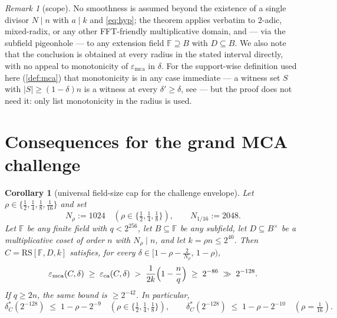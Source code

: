 \documentclass[11pt]{article}
\newtheorem{corollary}[theorem]{Corollary}
\theoremstyle{definition}
\theoremstyle{remark}
\newtheorem{remark}[theorem]{Remark}
\newcommand{\F}{\mathbb{F}}
\newcommand{\B}{B}
\newcommand{\RS}{\mathrm{RS}}
\newcommand{\eca}{\varepsilon_{\mathrm{ca}}}
\newcommand{\emca}{\varepsilon_{\mathrm{mca}}}
\begin{document}
\begin{remark}[scope]\label{rem:scope}
No smoothness is assumed beyond the existence of a single divisor $N\mid n$ with $a\mid k$ and \eqref{eq:hyp}; the theorem applies verbatim to $2$-adic, mixed-radix, or any other FFT-friendly multiplicative domain, and --- via the subfield pigeonhole --- to any extension field $\F\supseteq\B$ with $D\subseteq\B$. We also note that the conclusion is obtained at every radius in the stated interval directly, with no appeal to monotonicity of $\emca$ in $\delta$. For the support-wise definition used here (\cref{def:mca}) that monotonicity is in any case immediate --- a witness set $S$ with $|S|\ge(1-\delta)n$ is a witness at every $\delta'\ge\delta$, see \cite[Lem.\ ``Monotonicity'']{Cho26a} --- but the proof does not need it: only list monotonicity in the radius is used.
\end{remark}

\section{Consequences for the grand MCA challenge}\label{sec:grand}

\begin{corollary}[universal field-size cap for the challenge envelope]\label{cor:grand}
Let $\rho\in\{\frac12,\frac14,\frac18,\frac1{16}\}$ and set
\[
N_\rho:=1024\quad(\rho\in\{\tfrac12,\tfrac14,\tfrac18\}),\qquad N_{1/16}:=2048 .
\]
Let $\F$ be any finite field with $q<2^{256}$, let $\B\subseteq\F$ be any subfield, let $D\subseteq\B^\times$ be a multiplicative coset of order $n$ with $N_\rho\mid n$, and let $k=\rho n\le2^{40}$. Then $C=\RS[\F,D,k]$ satisfies, for every $\delta\in\bigl[1-\rho-\frac2{N_\rho},\,1-\rho\bigr)$,
\[
\emca(C,\delta)\;\ge\;\eca(C,\delta)
\;>\;\frac1{2k}\Bigl(1-\frac nq\Bigr)
\;\ge\;2^{-86}\;\gg\;2^{-128}.
\]
If $q\ge2n$, the same bound is $\ge2^{-42}$. In particular,
\[
\delta^*_C(2^{-128})\;\le\;1-\rho-2^{-9}\quad(\rho\in\{\tfrac12,\tfrac14,\tfrac18\}),
\qquad
\delta^*_C(2^{-128})\;\le\;1-\rho-2^{-10}\quad(\rho=\tfrac1{16}).
\]
\end{corollary}
\end{document}
